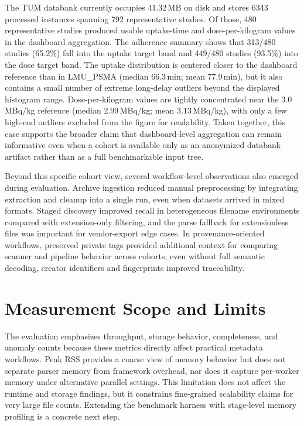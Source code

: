 The TUM databank currently occupies 41.32\,MB on disk and stores 6343 processed instances spanning 792 representative studies. Of those, 480 representative studies produced usable uptake-time and dose-per-kilogram values in the dashboard aggregation. The adherence summary shows that 313/480 studies (65.2\%) fall into the uptake target band and 449/480 studies (93.5\%) into the dose target band. The uptake distribution is centered closer to the dashboard reference than in LMU\_PSMA (median 66.3\,min; mean 77.9\,min), but it also contains a small number of extreme long-delay outliers beyond the displayed histogram range. Dose-per-kilogram values are tightly concentrated near the 3.0\,MBq/kg reference (median 2.99\,MBq/kg; mean 3.13\,MBq/kg), with only a few high-end outliers excluded from the figure for readability. Taken together, this case supports the broader claim that dashboard-level aggregation can remain informative even when a cohort is available only as an anonymized databank artifact rather than as a full benchmarkable input tree.

Beyond this specific cohort view, several workflow-level observations also emerged during evaluation. Archive ingestion reduced manual preprocessing by integrating extraction and cleanup into a single run, even when datasets arrived in mixed formats. Staged discovery improved recall in heterogeneous filename environments compared with extension-only filtering, and the parse fallback for extensionless files was important for vendor-export edge cases. In provenance-oriented workflows, preserved private tags provided additional context for comparing scanner and pipeline behavior across cohorts; even without full semantic decoding, creator identifiers and fingerprints improved traceability.

\section{Measurement Scope and Limits}
The evaluation emphasizes throughput, storage behavior, completeness, and anomaly counts because these metrics directly affect practical metadata workflows. Peak RSS provides a coarse view of memory behavior but does not separate parser memory from framework overhead, nor does it capture per-worker memory under alternative parallel settings. This limitation does not affect the runtime and storage findings, but it constrains fine-grained scalability claims for very large file counts. Extending the benchmark harness with stage-level memory profiling is a concrete next step.
